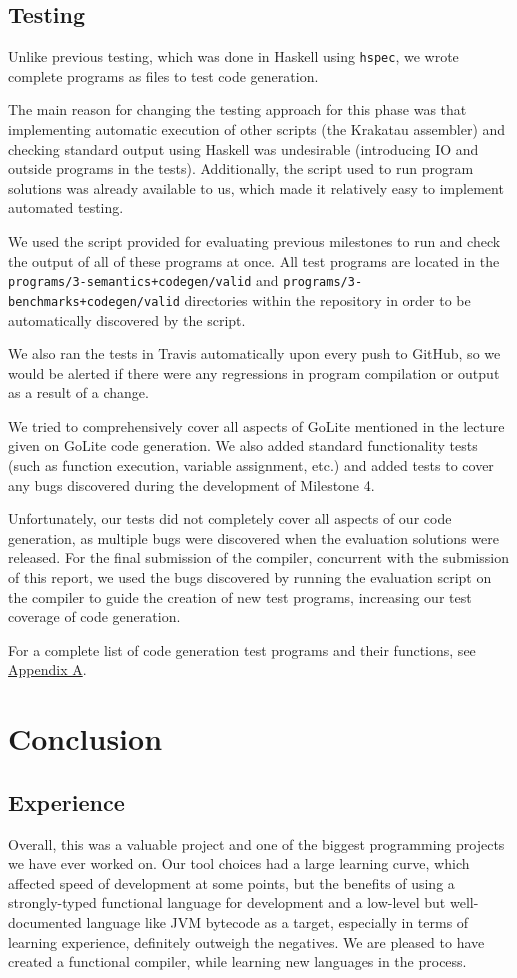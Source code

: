 \documentclass[11pt]{article}
\begin{document}
\subsection{Testing}
Unlike previous testing, which was done in Haskell using
\texttt{hspec}, we wrote complete programs as files to test code
generation.

The main reason for changing the testing approach for this phase was
that implementing automatic execution of other scripts (the Krakatau
assembler) and checking standard output using Haskell was undesirable
(introducing IO and outside programs in the tests). Additionally, the
script used to run program solutions was already available to us,
which made it relatively easy to implement automated testing.

We used the script provided for evaluating previous milestones to run
and check the output of all of these programs at once. All test
programs are located in the
\texttt{programs/3-semantics+codegen/valid} and
\texttt{programs/3-benchmarks+codegen/valid} directories within the
repository in order to be automatically discovered by the script.

We also ran the tests in Travis automatically upon every push to
GitHub, so we would be alerted if there were any regressions in
program compilation or output as a result of a change.

We tried to comprehensively cover all aspects of GoLite mentioned in
the lecture given on GoLite code generation. We also added standard
functionality tests (such as function execution, variable assignment,
etc.) and added tests to cover any bugs discovered during the
development of Milestone 4.

Unfortunately, our tests did not completely cover all aspects of our
code generation, as multiple bugs were discovered when the evaluation
solutions were released. For the final submission of the compiler,
concurrent with the submission of this report, we used the bugs
discovered by running the evaluation script on the compiler to guide
the creation of new test programs, increasing our test coverage of
code generation.

For a complete list of code generation test programs and their
functions, see \hyperref[sec:appendixa]{Appendix A}.

\section{Conclusion}
\subsection{Experience}
Overall, this was a valuable project and one of the biggest
programming projects we have ever worked on. Our tool choices had a
large learning curve, which affected speed of development at some
points, but the benefits of using a strongly-typed functional language
for development and a low-level but well-documented language like JVM
bytecode as a target, especially in terms of learning experience,
definitely outweigh the negatives.  We are pleased to have created a
functional compiler, while learning new languages in the process.
\end{document}
